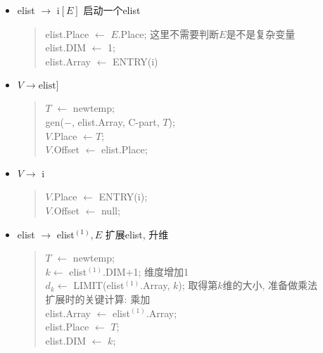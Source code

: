 \begin{itemize}
\begin{verse}
                            \end{verse}
                        \item elist $\to$ i$[E]$ \hfill 启动一个elist
                            \begin{verse}
                                elist.Place $\gets$ $E$.Place; \hfill 这里不需要判断$E$是不是复杂变量 \\
                                elist.DIM $\gets$ 1; \\
                                elist.Array $\gets$ ENTRY(i)
                            \end{verse}
                        \item $V\to \mathrm{elist}]$
                            \begin{verse}
                                $T$ $\gets$ newtemp; \\
                                gen($-$, elist.Array, C-part, $T$); \\
                                $V$.Place $\gets T$; \\
                                $V$.Offset $\gets$ elist.Place;
                            \end{verse}
                        \item $V\to$ i
                            \begin{verse}
                                $V$.Place $\gets$ ENTRY(i); \\
                                $V$.Offset $\gets$ null; 
                            \end{verse}
                        \item elist $\to$ elist$^{(1)}, E$ \hfill 扩展elist, 升维
                            \begin{verse}
                                $T$ $\gets$ newtemp; \\
                                $k \gets$ elist$^{(1)}$.DIM+1; \hfill 维度增加1 \\
                                $d_k \gets$ LIMIT(elist$^{(1)}$.Array, $k$); \hfill 取得第$k$维的大小, 准备做乘法 \\ 
                                 \hfill 扩展时的关键计算: 乘加 \\
                                elist.Array $\gets$ elist$^{(1)}$.Array; \\
                                elist.Place $\gets$ $T$; \\
                                elist.DIM $\gets$ $k$;
                            \end{verse}
                    \end{itemize}

